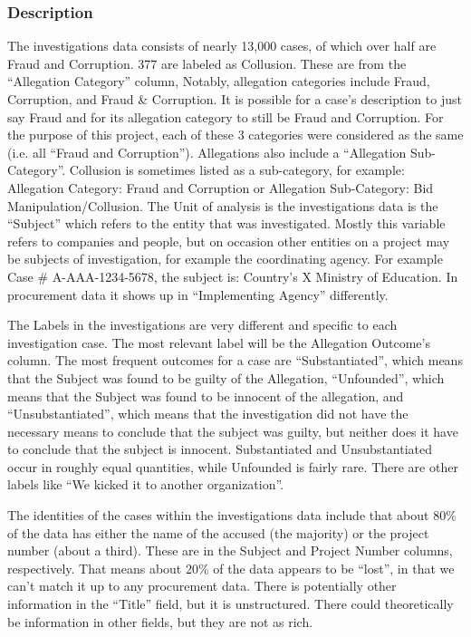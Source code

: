 \subsubsection{Description}

The investigations data consists of nearly 13,000 cases, of which over half are Fraud and Corruption. 377 are labeled as Collusion. These are from the ``Allegation Category'' column, Notably, allegation categories include Fraud, Corruption, and Fraud \& Corruption. It is possible for a case's description to just say Fraud and for its allegation category to still be Fraud and Corruption. For the purpose of this project, each of these 3 categories were considered as the same (i.e. all ``Fraud and Corruption''). Allegations also include a ``Allegation Sub-Category''. Collusion is sometimes listed as a sub-category, for example: Allegation Category: Fraud and Corruption or Allegation Sub-Category: Bid Manipulation/Collusion. The Unit of analysis is the investigations data is the ``Subject'' which refers to the entity that was investigated. Mostly this variable refers to companies and people, but on occasion other entities on a project may be subjects of investigation, for example the coordinating agency. For example Case \# A-AAA-1234-5678, the subject is: Country's X Ministry of Education. In procurement data it shows up in ``Implementing Agency'' differently.
    
The Labels in the investigations are very different and specific to each investigation case. The most relevant label will be the Allegation Outcome's column. The most frequent outcomes for a case are ``Substantiated'', which means that the Subject was found to be guilty of the Allegation, ``Unfounded'', which means that the Subject was found to be  innocent of the allegation, and ``Unsubstantiated'', which means that the investigation did not have the necessary means to conclude that the subject was  guilty, but neither does it have to conclude that the subject is innocent. Substantiated and Unsubstantiated occur in roughly equal quantities, while Unfounded is fairly rare. There are other labels like ``We kicked it to another organization''.

The identities of the cases within the investigations data include that about 80\% of the data has either the name of the accused (the majority) or the project number (about a third). These are in the Subject and Project Number columns, respectively. That means about 20\% of the data appears to be ``lost'', in that we can't match it up to any procurement data. There is potentially other information in the ``Title'' field, but it is unstructured. There could theoretically be information in other fields, but they are not as rich.

